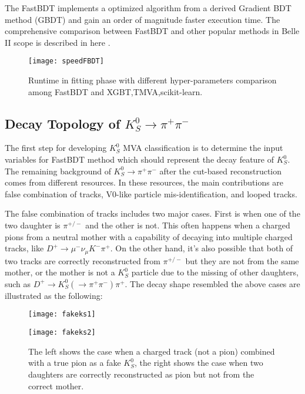 The FastBDT implements a optimized algorithm from a derived Gradient BDT method (GBDT)\cite{friedman2001greedy} and gain an order of magnitude faster execution time. The comprehensive comparison between FastBDT and other popular methods in Belle II scope is described in here \cite{keck2016fastbdt}. 

\begin{figure}[htpb]
	\centering
	\texttt{[image: speedFBDT]}
	\caption{Runtime in fitting phase with different hyper-parameters comparison among FastBDT and XGBT,TMVA,scikit-learn.\cite{keck2016fastbdt}}
\end{figure}

\subsection{Decay Topology of $K_S^0 \to \pi^+ \pi^-$}
The first step for developing $K_S^0$ MVA classification is to determine the input variables for FastBDT method which should represent the decay feature of $K_S^0$.
The remaining background of  $K_S^0 \to \pi^+ \pi^-$ after the cut-based reconstruction comes from different resources. In these resources, the main contributions are false combination of tracks, V0-like particle mis-identification, and looped tracks. 

The false combination of tracks includes two major cases. First is when one of the two daughter is $\pi^{+/-}$ and the other is not. This often happens when a charged pions from a neutral mother with a capability of decaying into multiple charged tracks, like $D^+ \to \mu^- \nu_{\mu} K^- \pi^+$. On the other hand, it's also possible that both of two tracks are correctly reconstructed from $\pi^{+/-}$ but they are not from the same mother, or the mother is not a $K_S^0$ particle due to the missing of other daughters, such as $D^+ \to K_S^0 (  \to \pi^+ \pi^-) \pi^+$. The decay shape resembled the above cases are illustrated as the following:  


\begin{figure}[htpb]
	\begin{minipage}[t]{0.5\linewidth} %
		\centering 
		\texttt{[image: fakeks1]} 
		\label{fig:side:a} 
	\end{minipage}%
	\begin{minipage}[t]{0.5\linewidth} 
		\centering 
		\texttt{[image: fakeks2]} 
		\label{fig:side:b} 
	\end{minipage}%
	
	\caption{The left shows the case when a charged track (not a pion) combined with a true pion as a fake $K_S^0$, the right shows the case when two daughters are correctly reconstructed as pion but not from the correct mother. }
\end{figure}

